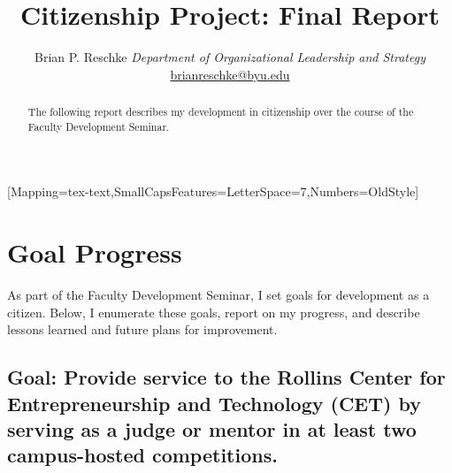 \documentclass[11pt,article,oneside]{memoir}
\author{\Large Brian P. Reschke\vspace{0.05in} \newline\normalsize\emph{Department of Organizational Leadership and Strategy} \newline\footnotesize \protect\url{brianreschke@byu.edu}\vspace*{0.2in}\newline }
\date{}
\def\mytitle{\LARGE Citizenship Project: Final Report}
\begin{document}


\setmainfont{Minion Pro}[Mapping=tex-text,SmallCapsFeatures={LetterSpace=7},Numbers=OldStyle]
\setsansfont[Mapping=tex-text]{Minion Pro}
\setmonofont[Mapping=tex-text,Scale=0.9]{Inconsolata}
\pagestyle{kjh}
\setcounter{secnumdepth}{-1}


\title{\mytitle}
\maketitle



\begin{abstract}

\noindent The following report describes my development in citizenship over the
course of the Faculty Development Seminar.

\end{abstract}


\section{Goal Progress}\label{goal-progress}

As part of the Faculty Development Seminar, I set goals for development
as a citizen. Below, I enumerate these goals, report on my progress, and
describe lessons learned and future plans for improvement.

\subsection{Goal: Provide service to the Rollins Center for
Entrepreneurship and Technology (CET) by serving as a judge or mentor in
at least two campus-hosted
competitions.}\label{goal-provide-service-to-the-rollins-center-for-entrepreneurship-and-technology-cet-by-serving-as-a-judge-or-mentor-in-at-least-two-campus-hosted-competitions.}
\end{document}

